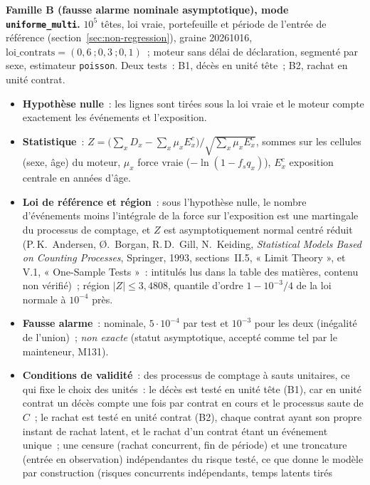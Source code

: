 \documentclass[a4paper,11pt]{article}
\newcommand{\code}[1]{\texttt{\small #1}}
\begin{document}
\medskip
\noindent
\textbf{Famille B (fausse alarme nominale asymptotique), mode
\code{uniforme\_multi}.} $10^{5}$ têtes, loi vraie, portefeuille et période
de l'entrée de référence (section~\ref{sec:non-regression}), graine
20261016, $\text{loi\_contrats} = (0{,}6~; 0{,}3~; 0{,}1)$~; moteur sans
délai de déclaration, segmenté par sexe, estimateur \code{poisson}. Deux
tests~: B1, décès en unité tête~; B2, rachat en unité contrat.
\begin{itemize}[leftmargin=*, itemsep=2pt]
  \item \textbf{Hypothèse nulle}~: les lignes sont tirées sous la loi vraie
    et le moteur compte exactement les événements et l'exposition.
  \item \textbf{Statistique}~: $Z = \bigl(\sum_x D_x - \sum_x \mu_x
    E^{c}_x\bigr) \big/ \sqrt{\textstyle\sum_x \mu_x E^{c}_x}$, sommes sur
    les cellules (sexe, âge) du moteur, $\mu_x$ force vraie
    ($-\ln(1 - f_s q_x)$), $E^{c}_x$ exposition centrale en années d'âge.
  \item \textbf{Loi de référence et région}~: sous l'hypothèse nulle, le
    nombre d'événements moins l'intégrale de la force sur l'exposition est
    une martingale du processus de comptage, et $Z$ est asymptotiquement
    normal centré réduit (P.\,K.~Andersen, Ø.~Borgan, R.\,D.~Gill,
    N.~Keiding, \emph{Statistical Models Based on Counting Processes},
    Springer, 1993, sections~II.5, « Limit Theory », et V.1, « One-Sample
    Tests »~: intitulés lus dans la table des matières, contenu non
    vérifié)~; région $|Z| \le 3{,}4808$,
    quantile d'ordre $1 - 10^{-3}/4$ de la loi normale à $10^{-4}$ près.
  \item \textbf{Fausse alarme}~: nominale, $5 \cdot 10^{-4}$ par test et
    $10^{-3}$ pour les deux (inégalité de l'union)~; \emph{non exacte}
    (statut asymptotique, accepté comme tel par le mainteneur, M131).
  \item \textbf{Conditions de validité}~: des processus de comptage à
    sauts unitaires, ce qui fixe le choix des unités~: le décès est testé en
    unité tête (B1), car en unité contrat un décès compte une fois par
    contrat en cours et le processus saute de $C$~; le rachat est testé en
    unité contrat (B2), chaque contrat ayant son propre instant de rachat
    latent, et le rachat d'un contrat étant un événement unique~; une
    censure (rachat concurrent, fin de période) et une troncature (entrée
    en observation) indépendantes du risque testé, ce que donne le modèle
    par construction (risques concurrents indépendants, temps latents tirés

\end{itemize}
\end{document}
